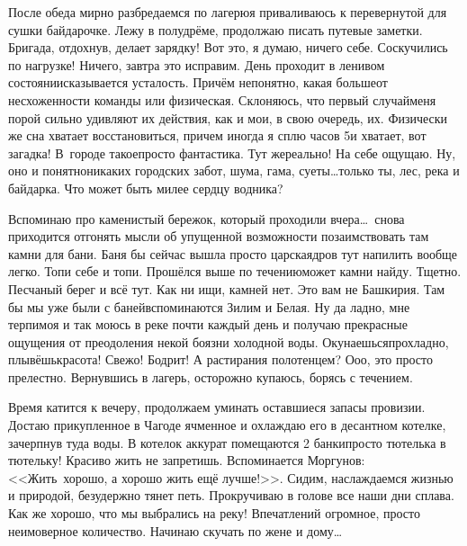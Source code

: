 После обеда мирно разбредаемся по лагерю\mdash я приваливаюсь к перевернутой для сушки байдарочке. Лежу в полудрёме, продолжаю писать путевые заметки. Бригада, отдохнув, делает зарядку! Вот это, я думаю, ничего себе. Соскучились по нагрузке! Ничего, завтра это исправим. День проходит в ленивом состоянии\mdash сказывается усталость. Причём непонятно, какая больше\mdash от несхоженности команды или физическая. Склоняюсь, что первый случай\mdash меня порой сильно удивляют их действия, как и мои, в свою очередь, их. Физически же сна хватает восстановиться, причем иногда я сплю часов 5\mdash и хватает, вот загадка! В~городе такое\mdash просто фантастика. Тут же\mdash реально! На себе ощущаю. Ну, оно и понятно\mdash никаких городских забот, шума, гама, суеты\ldots только ты, лес, река и байдарка. Что может быть милее сердцу водника? 

Вспоминаю про каменистый бережок, который проходили вчера\ldots~снова приходится отгонять мысли об упущенной возможности позаимствовать там камни для бани. Баня бы сейчас вышла просто царская\mdash дров тут напилить вообще легко. Топи себе и топи. Прошёлся выше по течению\mdash может камни найду. Тщетно. Песчаный берег и всё тут. Как ни ищи, камней нет. Это вам не Башкирия. Там бы мы уже были с баней\mdash вспоминаются Зилим и Белая. Ну да ладно, мне терпимо\mdash я и так моюсь в реке почти каждый день и получаю прекрасные ощущения от преодоления некой боязни холодной воды. Окунаешься\mdash прохладно, плывёшь\mdash красота! Свежо! Бодрит! А растирания полотенцем? О\sdash о\sdash о, это просто прелестно. Вернувшись в лагерь, осторожно купаюсь, борясь с течением. 

Время катится к вечеру, продолжаем уминать оставшиеся запасы провизии. Достаю прикупленное в Чагоде ячменное и охлаждаю его в десантном котелке, зачерпнув туда воды. В котелок аккурат помещаются 2 банки\mdash просто тютелька в тютельку! Красиво жить не запретишь. Вспоминается Моргунов: <<Жить~хорошо, а хорошо жить ещё лучше!>>. Сидим, наслаждаемся жизнью и природой, безудержно тянет петь. Прокручиваю в голове все наши дни сплава. Как же хорошо, что мы выбрались на реку! Впечатлений огромное, просто неимоверное количество. Начинаю скучать по жене и дому\ldots~

